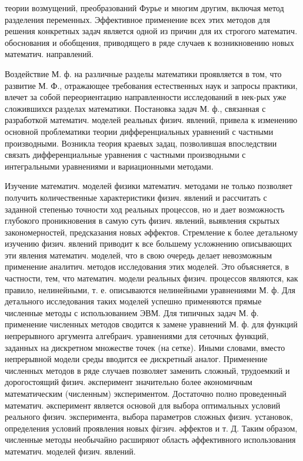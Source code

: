 \documentclass[10pt]{article}
\begin{document}
теории возмущений, преобразований Фурье и многим другим, включая метод разделения переменных. Эффективное применение всех этих методов для решения конкретных задач является одной из причин для их строгого математич. обоснования и обобщения, приводящего в ряде случаев к возникновению новых математич. направлений.



Воздействие М. ф. на различные разделы математики проявляется в том, что развитие М. Ф., отражающее требования естественных наук и запросы практики, влечет за собой переориентацию направленности исследований в нек-рых уже сложившихся разделах математики. Постановка задач М. ф., связанная с разработкой математич. моделей реальных физич. явлений, привела к изменению основной проблематики теории дифференциальных уравнений с частными производными. Возникла теория краевых задац, позволившая впоследствии связать дифференциальные уравнения с частными производными с интегральными уравнениями и вариационными методами.



Изучение математич. моделей физики математич. методами не только позволяет получить количественные характеристики физич. явлений и рассчитать с заданной степенью точности ход реальных процессов, но и дает возможность глубокого проникновения в самую суть физич. явлений, выявления скрытых закономерностей, предсказания новых әффектов. Стремление к более детальному изучению физич. явлений приводит к все большему усложнению описывающих эти явления математич. моделей, что в свою очередь делает невозможным применение аналитич. методов исследования этих моделей. Это объясняется, в частности, тем, что математич. модели реальных физич. процессов являются, как правило, нелинейными, т. е. описываются нелинейными уравнениями М. ф. Для детального исследования таких моделей успешно применяются прямые численные методы с использованием ЭВМ. Для типичных задач М. ф. применение численных методов сводится к замене уравнений М. ф. для функций непрерывного аргумента алгебраич. уравнениями для сеточных функций, заданных на дискретном множестве точек (на сетке). Иными словами, вместо непрерывной модели среды вводится ее дискретный аналог. Применение численных методов в ряде случаев позволяет заменить сложный, трудоемкий и дорогостоящий физич. әксперимент значительно более әкономичным математическим (численным) экспериментом. Достаточно полно проведенный математич. әксперимент является основой для выбора оптимальных условий реального физич. эксперимента, выбора параметров сложных физич. установок, определения условий проявления новых фігзич. әффектов и т. Д. Таким образом, численные методы необычайно расширяют область әффективного использования математич. моделей физич. явлений.
\end{document}
